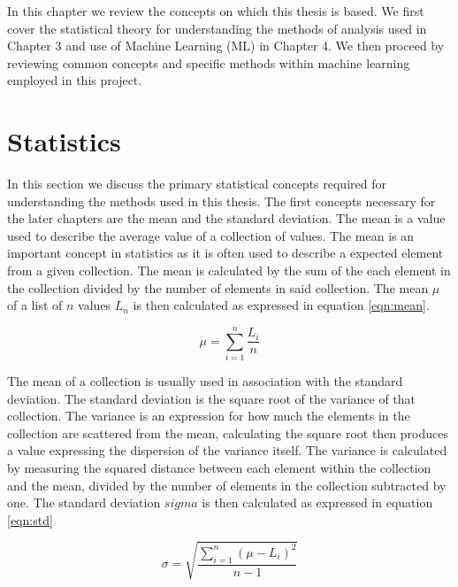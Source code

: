 In this chapter we review the concepts on which this thesis is based. We first cover the statistical theory for understanding the methods of analysis used in Chapter 3 and use of Machine Learning (ML) in Chapter 4. We then proceed by reviewing common concepts and specific methods within machine learning employed in this project.


\section{Statistics}

In this section we discuss the primary statistical concepts required for understanding the methods used in this thesis. The first concepts necessary for the later chapters are the mean and the standard deviation. The mean is a value used to describe the average value of a collection of values. The mean is an important concept in statistics as it is often used to describe a expected element from a given collection. The mean is calculated by the sum of the each element in the collection divided by the number of elements in said collection. The mean $\mu$ of a list of $n$ values $L_n$ is then calculated as expressed in equation \ref{eqn:mean}.

\begin{equation}
\label{eqn:mean}
\mu = \sum_{i=1}^n \frac{L_i}{n}
\end{equation}

The mean of a collection is usually used in association with the standard deviation. The standard deviation is the square root of the variance of that collection. The variance is an expression for how much the elements in the collection are scattered from the mean, calculating the square root then produces a value expressing the dispersion of the variance itself. The variance is calculated by measuring the squared distance between each element within the collection and the mean, divided by the number of elements in the collection subtracted by one. The standard deviation $sigma$ is then calculated as expressed in equation \ref{eqn:std}

\begin{equation}
\label{eqn:std}
 \sigma = \sqrt{\frac{\sum_{i = 1}^{n} (\mu - L_i)^2}{n-1}}
\end{equation}

